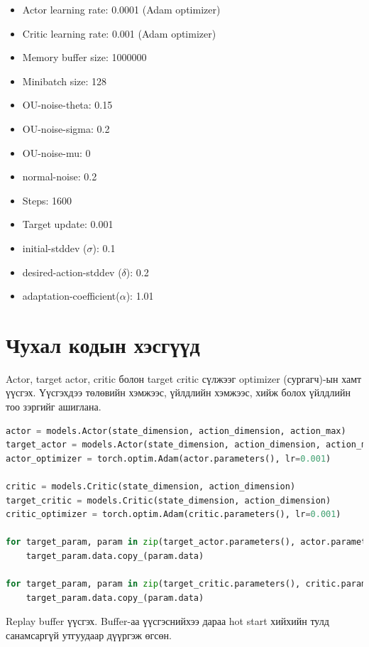 \documentclass[12pt,A4]{report}
\begin{document}
\begin{itemize}
	\item Actor learning rate: 0.0001 (Adam optimizer)
	\item Critic learning rate: 0.001 (Adam optimizer)
	\item Memory buffer size: 1000000
	\item Minibatch size: 128
	\item OU-noise-theta: 0.15
	\item OU-noise-sigma: 0.2
	\item OU-noise-mu: 0
	\item normal-noise: 0.2
	\item Steps: 1600
	\item Target update: 0.001
	\item initial-stddev ($\sigma$): 0.1
	\item desired-action-stddev ($\delta$): 0.2
	\item adaptation-coefficient($\alpha$): 1.01
\end{itemize}

\section{Чухал кодын хэсгүүд}

Actor, target actor, critic болон target critic сүлжээг optimizer (сургагч)-ын хамт үүсгэх. Үүсгэхдээ төлөвийн хэмжээс, үйлдлийн хэмжээс, хийж болох үйлдлийн тоо зэргийг ашиглана.

\begin{lstlisting}[language=Python, caption=Actor critic сүлжээ үүсгэх, frame=single]
actor = models.Actor(state_dimension, action_dimension, action_max)
target_actor = models.Actor(state_dimension, action_dimension, action_max)
actor_optimizer = torch.optim.Adam(actor.parameters(), lr=0.001)

critic = models.Critic(state_dimension, action_dimension)
target_critic = models.Critic(state_dimension, action_dimension)
critic_optimizer = torch.optim.Adam(critic.parameters(), lr=0.001)

for target_param, param in zip(target_actor.parameters(), actor.parameters()):
	target_param.data.copy_(param.data)

for target_param, param in zip(target_critic.parameters(), critic.parameters()):
    target_param.data.copy_(param.data)
\end{lstlisting}

Replay buffer үүсгэх. Buffer-аа үүсгэснийхээ дараа hot start хийхийн тулд санамсаргүй утгуудаар дүүргэж өгсөн.
\end{document}
